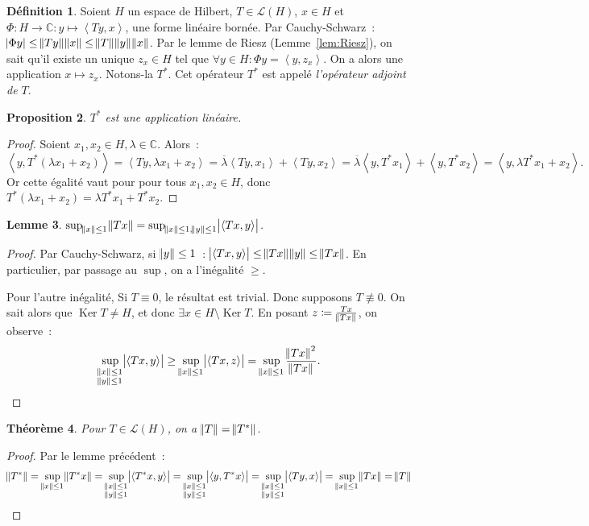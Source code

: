\documentclass{report}
\DeclareMathOperator{\Ker}{Ker}
\newcommand{\C}{{\mathbb C}}
\newcommand{\scpr}[2]{\left\langle#1, #2\right\rangle}
\newtheorem{thm}{Théorème}[chapter]
\newtheorem{prp}[thm]{Proposition}
\newtheorem{lem}[thm]{Lemme}
\theoremstyle{definition}
\newtheorem{déf}[thm]{Définition}
\theoremstyle{remark}
\begin{document}
\begin{déf} Soient $H$ un espace de Hilbert, $T \in \mathcal L(H)$, $x \in H$ et $\Phi : H \to \C : y \mapsto \scpr {Ty}x$, une forme linéaire bornée. Par Cauchy-Schwarz~:
$\abs {\Phi y} \leq \norm {Ty}\norm x \leq \norm T\norm y\norm x$. Par le lemme de Riesz (Lemme~\ref{lem:Riesz}), on sait qu'il existe un unique $z_x \in H$ tel que
$\forall y \in H : \Phi y = \scpr y{z_x}$. On a alors une application $x \mapsto z_x$. Notons-la $T^*$. Cet opérateur $T^*$ est appelé \textit{l'opérateur adjoint de $T$}.
\end{déf}


\begin{prp} $T^*$ est une application linéaire.
\end{prp}

\begin{proof} Soient $x_1, x_2 \in H, \lambda \in \C$. Alors~:
\[\scpr y{T^*(\lambda x_1 + x_2)} = \scpr {Ty}{\lambda x_1 + x_2} = \overline \lambda \scpr {Ty}{x_1} + \scpr {Ty}{x_2} = \overline \lambda\scpr y{T^*x_1} + \scpr y{T^*x_2}
= \scpr y{\lambda T^*x_1 + x_2}.\]
Or cette égalité vaut pour pour tous $x_1, x_2 \in H$, donc $T^*(\lambda x_1 + x_2) = \lambda T^*x_1 + T^*x_2$.
\end{proof}

\begin{lem} $\sup_{\norm x \leq 1}\norm {Tx} = \sup_{\norm x \leq 1, \norm y \leq 1}\abs {\scpr {Tx}y}$.
\end{lem}

\begin{proof} Par Cauchy-Schwarz, si $\norm y \leq 1$~: $\abs {\scpr {Tx}y} \leq \norm {Tx}\norm y \leq \norm {Tx}$. En particulier, par passage au $\sup$, on a
l'inégalité $\geq$.

Pour l'autre inégalité, Si $T \equiv 0$, le résultat est trivial. Donc supposons $T \not \equiv 0$. On sait alors que $\Ker T \neq H$, et donc $\exists x \in H \setminus \Ker T$.
En posant $z \coloneqq \frac {Tx}{\norm {Tx}}$, on observe~:
\[\sup_{\substack {\norm x \leq 1 \\ \norm y \leq 1}}\abs {\scpr {Tx}y} \geq \sup_{\norm x \leq 1}\abs {\scpr {Tx}z} = \sup_{\norm x \leq 1}\frac {\norm {Tx}^2}{\norm {Tx}}.\]
\end{proof}

\begin{thm} Pour $T \in \mathcal L(H)$, on a $\norm T = \norm {T^*}$.
\end{thm}

\begin{proof} Par le lemme précédent~:
\[\norm {T^*} = \sup_{\norm x \leq 1}\norm {T^*x} = \sup_{\substack {\norm x \leq 1 \\ \norm y \leq 1}}\abs {\scpr {T^*x}y}
	= \sup_{\substack {\norm x \leq 1 \\ \norm y \leq 1}}\abs {\scpr y{T^*x}} = \sup_{\substack {\norm x \leq 1 \\ \norm y \leq 1}}\abs {\scpr {Ty}x}
	= \sup_{\norm x \leq 1}\norm {Tx} = \norm T\]
\end{proof}
\end{document}
